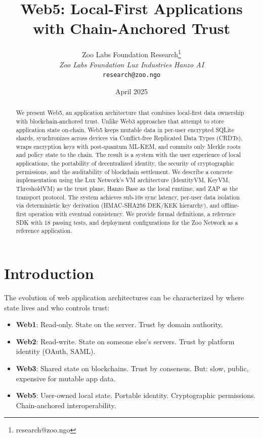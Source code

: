 \documentclass[twocolumn,11pt]{article}
\title{\textbf{Web5: Local-First Applications with Chain-Anchored Trust}}
\author{
Zoo Labs Foundation Research\thanks{research@zoo.ngo}\\
\textit{Zoo Labs Foundation \quad Lux Industries \quad Hanzo AI}\\
\texttt{research@zoo.ngo}
}
\date{April 2025}
\begin{document}
\maketitle

\begin{abstract}
We present Web5, an application architecture that combines local-first data ownership with blockchain-anchored trust. Unlike Web3 approaches that attempt to store application state on-chain, Web5 keeps mutable data in per-user encrypted SQLite shards, synchronizes across devices via Conflict-free Replicated Data Types (CRDTs), wraps encryption keys with post-quantum ML-KEM, and commits only Merkle roots and policy state to the chain. The result is a system with the user experience of local applications, the portability of decentralized identity, the security of cryptographic permissions, and the auditability of blockchain settlement. We describe a concrete implementation using the Lux Network's VM architecture (IdentityVM, KeyVM, ThresholdVM) as the trust plane, Hanzo Base as the local runtime, and ZAP as the transport protocol. The system achieves sub-10\textmu{}s sync latency, per-user data isolation via deterministic key derivation (HMAC-SHA256 DEK/KEK hierarchy), and offline-first operation with eventual consistency. We provide formal definitions, a reference SDK with 18 passing tests, and deployment configurations for the Zoo Network as a reference application.
\end{abstract}

\section{Introduction}

The evolution of web application architectures can be characterized by where state lives and who controls trust:

\begin{itemize}
\item \textbf{Web1}: Read-only. State on the server. Trust by domain authority.
\item \textbf{Web2}: Read-write. State on someone else's servers. Trust by platform identity (OAuth, SAML).
\item \textbf{Web3}: Shared state on blockchains. Trust by consensus. But: slow, public, expensive for mutable app data.
\item \textbf{Web5}: User-owned local state. Portable identity. Cryptographic permissions. Chain-anchored interoperability.
\end{itemize}
\end{document}
